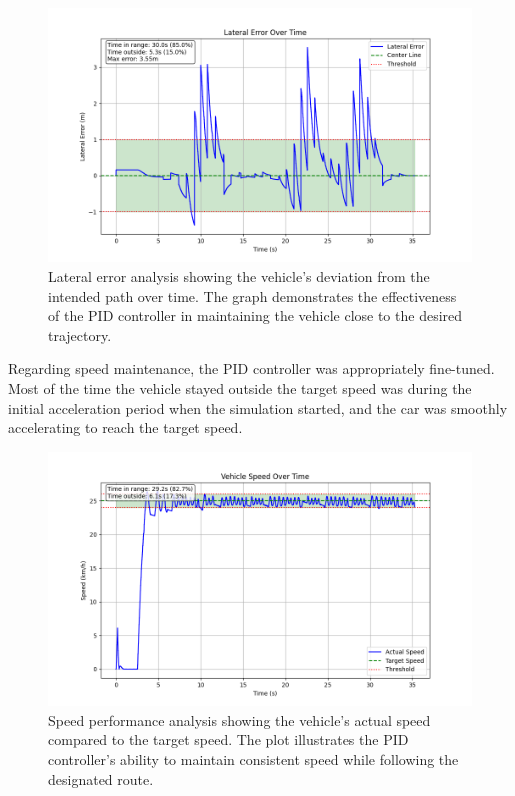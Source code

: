 \documentclass[conference]{IEEEtran}
\begin{document}
\begin{figure}[h]
    \centering
    \includegraphics[width=\columnwidth]{Plots/lateral_error_waypoints0.png}
    \caption{Lateral error analysis showing the vehicle's deviation from the intended path over time. The graph demonstrates the effectiveness of the PID controller in maintaining the vehicle close to the desired trajectory.}
    \label{fig:lateral_error}
\end{figure}

Regarding speed maintenance, the PID controller was appropriately fine-tuned. Most of the time the vehicle stayed outside the target speed was during the initial acceleration period when the simulation started, and the car was smoothly accelerating to reach the target speed.

\begin{figure}[h]
    \centering
    \includegraphics[width=\columnwidth]{Plots/speed_performance_waypoints0.png}
    \caption{Speed performance analysis showing the vehicle's actual speed compared to the target speed. The plot illustrates the PID controller's ability to maintain consistent speed while following the designated route.}
    \label{fig:speed_performance}
\end{figure}
\end{document}
